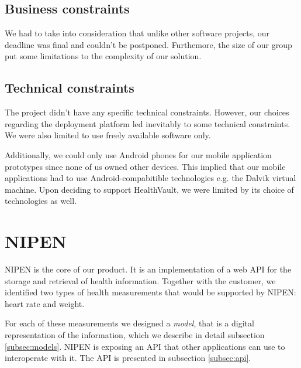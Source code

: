 \subsection{Business constraints}
\label{subsec:business-constraints}

We had to take into consideration that unlike other software projects, our deadline was final
and couldn't be postponed. Furthemore, the size of our group put some limitations
to the complexity of our solution.

\subsection{Technical constraints}

The project didn't have any specific technical constraints.
However, our choices regarding the deployment platform led inevitably to some technical
constraints. We were also limited to use freely available software only.


Additionally, we could only use Android phones for our mobile application prototypes
since none of us owned other devices. This implied that our mobile applications
had to use Android-compabitible technologies e.g. the Dalvik virtual machine.
Upon deciding to support HealthVault, we were limited by its choice of
technologies as well.

\section{NIPEN}

NIPEN is the core of our product. 
It is an implementation of a web API for the storage and retrieval of health information.
Together with the customer, we identified two types of health measurements that would be supported by NIPEN: heart rate and weight.

For each of these measurements we designed a \textit{model}, that is a digital representation of the information, which we describe in detail subsection \ref{subsec:models}.
NIPEN is exposing an API that other applications can use to interoperate with it.
The API is presented in subsection \ref{subsec:api}.

